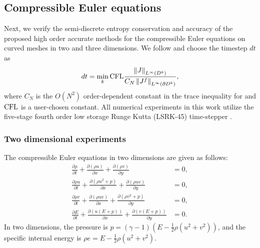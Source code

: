 \documentclass[preprint,10pt]{article}
\theoremstyle{definition}
\theoremstyle{lemma}
\theoremstyle{theorem}
\theoremstyle{assumption}
\newcommand{\pd}[2]{\frac{\partial#1}{\partial#2}}
\newcommand{\nor}[1]{\left\| #1 \right\|}
\newcommand{\LRp}[1]{\left( #1 \right)}
\begin{document}
{%
\subsection{Compressible Euler equations}

Next, we verify the semi-discrete entropy conservation and accuracy of the proposed high order accurate methods for the compressible Euler equations on curved meshes in two and three dimensions.  We follow \cite{chan2015gpu} and choose the timestep $dt$ as
\begin{equation}
dt = \min_{k} {\rm CFL} \frac{\nor{J}_{L^{\infty}\LRp{D^k}}}{C_N\nor{J^f}_{L^{\infty}\LRp{\partial D^k}}},
\end{equation}
where $C_N$ is the $O(N^2)$ order-dependent constant in the trace inequality for \cite{warburton2003constants} and ${\rm CFL}$ is a user-chosen constant.  All numerical experiments in this work utilize the five-stage fourth order low storage Runge Kutta (LSRK-45) time-stepper \cite{carpenter1994fourth}.  

\subsubsection{Two dimensional experiments}

The compressible Euler equations in two dimensions are given as follows:
\begin{align}
\pd{\rho}{t} + \pd{\LRp{\rho u}}{x} + \pd{\LRp{\rho v}}{y} &= 0,\\
\pd{\rho u}{t} + \pd{\LRp{\rho u^2 + p }}{x} + \pd{\LRp{\rho uv}}{y} &= 0,\nonumber\\
\pd{\rho v}{t} + \pd{\LRp{\rho uv}}{x} + \pd{\LRp{\rho v^2 + p }}{y} &= 0,\nonumber\\
\pd{E}{t} + \pd{\LRp{u(E+p)}}{x} + \pd{\LRp{v(E+p)}}{y}&= 0.\nonumber
\end{align}
In two dimensions, the pressure is $p = (\gamma-1)\LRp{E - \frac{1}{2}\rho (u^2+v^2)}$, and the specific internal energy is $\rho e = E - \frac{1}{2}\rho (u^2+v^2)$.  

}
\end{document}
